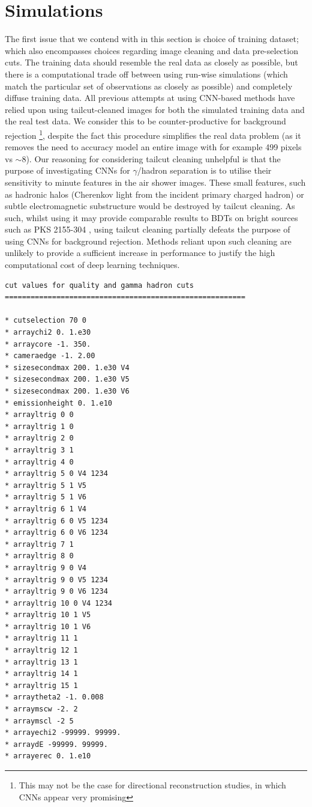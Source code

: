 \section{Simulations}
The first issue that we contend with in this section is choice of training dataset; which also encompasses choices regarding image cleaning and data pre-selection cuts. The training data should resemble the real data as closely as possible, but there is a computational trade off between using run-wise simulations (which match the particular set of observations as closely as possible) and completely diffuse training data. All previous attempts at using CNN-based methods have relied upon using tailcut-cleaned images \cite{Shilon}for both the simulated training data and the real test data. We consider this to be counter-productive for background rejection \footnote{This may not be the case for directional reconstruction studies, in which CNNs appear very promising}, despite the fact this procedure simplifies the real data problem (as it removes the need to accuracy model an entire image with for example 499 pixels vs $\sim$8). Our reasoning for considering tailcut cleaning unhelpful is that the purpose of investigating CNNs for $\gamma$/hadron separation is to utilise their sensitivity to minute features in the air shower images. These small features, such as hadronic halos \cite{model++}(Cherenkov light from the incident primary charged hadron) or subtle electromagnetic substructure would be destroyed by tailcut cleaning. As such, whilst using it may provide comparable results to BDTs on bright sources such as PKS 2155-304 \cite{Shilon}, using tailcut cleaning partially defeats the purpose of using CNNs for background rejection. Methods reliant upon such cleaning are unlikely to provide a sufficient increase in performance to justify the high computational cost of deep learning techniques.

\begin{lstlisting}[label=verb1,caption=Cut Description Used for the Real Data Analysis in Eventdisplay format,float,frame=tb]
cut values for quality and gamma hadron cuts
========================================================

* cutselection 70 0
* arraychi2 0. 1.e30
* arraycore -1. 350.
* cameraedge -1. 2.00
* sizesecondmax 200. 1.e30 V4
* sizesecondmax 200. 1.e30 V5
* sizesecondmax 200. 1.e30 V6
* emissionheight 0. 1.e10
* arrayltrig 0 0
* arrayltrig 1 0
* arrayltrig 2 0
* arrayltrig 3 1
* arrayltrig 4 0
* arrayltrig 5 0 V4 1234
* arrayltrig 5 1 V5
* arrayltrig 5 1 V6
* arrayltrig 6 1 V4
* arrayltrig 6 0 V5 1234
* arrayltrig 6 0 V6 1234
* arrayltrig 7 1
* arrayltrig 8 0
* arrayltrig 9 0 V4
* arrayltrig 9 0 V5 1234
* arrayltrig 9 0 V6 1234
* arrayltrig 10 0 V4 1234
* arrayltrig 10 1 V5
* arrayltrig 10 1 V6
* arrayltrig 11 1
* arrayltrig 12 1
* arrayltrig 13 1
* arrayltrig 14 1
* arrayltrig 15 1
* arraytheta2 -1. 0.008
* arraymscw -2. 2
* arraymscl -2 5
* arrayechi2 -99999. 99999.
* arraydE -99999. 99999.
* arrayerec 0. 1.e10
\end{lstlisting}


